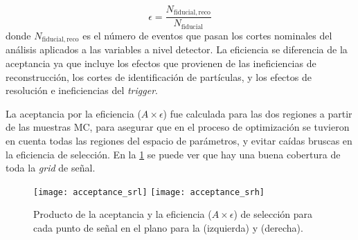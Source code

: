 \begin{equation}
  \epsilon = \frac{N_\mathrm{fiducial,reco}}{N_\mathrm{fiducial}}
\end{equation}
%
donde $N_\mathrm{fiducial,reco}$ es el número de eventos que pasan los cortes
nominales del análisis aplicados a las variables a nivel detector. La
eficiencia se diferencia de la aceptancia ya que incluye los efectos que provienen de
las ineficiencias de reconstrucción, los cortes de identificación de
partículas, y los efectos de resolución e ineficiencias del \emph{trigger}.

La aceptancia por la eficiencia ($A\times\epsilon$) fue calculada para las dos
regiones a partir de las muestras MC, para asegurar que en el proceso de
optimización se tuvieron en cuenta todas las regiones del espacio de parámetros,
y evitar caídas bruscas en la eficiencia de selección. En la
\cref{fig:atimeseff} se puede ver que hay una buena cobertura de toda la \emph{grid}
de señal.

\begin{figure}[!htb]
  \centering

  \texttt{[image: acceptance\_srl]}
  \hspace{1cm}%
  \texttt{[image: acceptance\_srh]}

  \caption{Producto de la aceptancia y la eficiencia  ($A \times \epsilon$) de selección para cada punto de señal
    en el plano {\mgmn} para la {\SRL} (izquierda) y {\SRH} (derecha).}
  \label{fig:atimeseff}
\end{figure}












